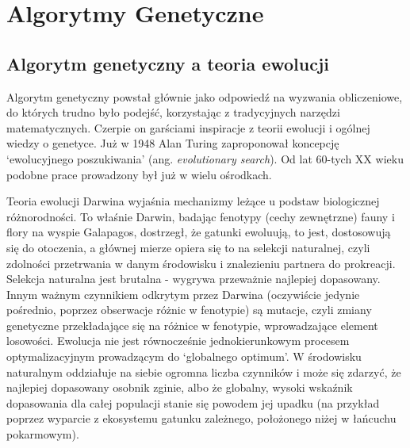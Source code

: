 \documentclass[a4paper,11pt]{article}
\begin{document}
    \section{Algorytmy Genetyczne}

    \subsection{Algorytm genetyczny a teoria ewolucji}

    Algorytm genetyczny powstał głównie jako odpowiedź na wyzwania obliczeniowe, do których trudno było podejść, korzystając z tradycyjnych narzędzi matematycznych. Czerpie on garściami inspiracje z teorii ewolucji i ogólnej wiedzy o genetyce. Już w 1948 Alan Turing zaproponował koncepcję `ewolucyjnego poszukiwania' (ang. \textit{evolutionary search}). Od lat 60-tych XX wieku podobne prace prowadzony był już w wielu ośrodkach\cite{IntroductionToEvolutionaryComputing2015}.

    \bigskip

    Teoria ewolucji Darwina wyjaśnia mechanizmy leżące u podstaw biologicznej różnorodności. To właśnie Darwin, badając fenotypy (cechy zewnętrzne) fauny i flory na wyspie Galapagos, dostrzegł, że gatunki ewoluują, to jest, dostosowują się do otoczenia, a głównej mierze opiera się to na selekcji naturalnej, czyli zdolności przetrwania w danym środowisku i znalezieniu partnera do prokreacji. Selekcja naturalna jest brutalna - wygrywa przeważnie najlepiej dopasowany. Innym ważnym czynnikiem odkrytym przez Darwina (oczywiście jedynie pośrednio, poprzez obserwacje różnic w fenotypie) są mutacje, czyli zmiany genetyczne przekładające się na różnice w fenotypie, wprowadzające element losowości. Ewolucja nie jest równocześnie jednokierunkowym procesem optymalizacyjnym prowadzącym do `globalnego optimum'. W środowisku naturalnym oddziałuje na siebie ogromna liczba czynników i może się zdarzyć, że najlepiej dopasowany osobnik zginie, albo że globalny, wysoki wskaźnik dopasowania dla całej populacji stanie się powodem jej upadku (na przykład poprzez wyparcie z ekosystemu gatunku zależnego, położonego niżej w łańcuchu pokarmowym)\cite{IntroductionToEvolutionaryComputing2015}.

    \bigskip
\end{document}
